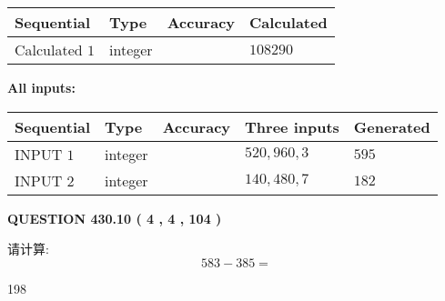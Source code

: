 \documentclass{ctexart}
\begin{document}
   
   
   
\noindent{}
   
   
  
  
\noindent\begin{tabular}{|l|l|l|l|}
\hline
 Sequential & Type & Accuracy & Calculated \\ 
\hline
 
 
  Calculated $  1 $ & integer &  & 
  $ 108290 $ 
 \\  \hline  
 \end{tabular}
   
   
   
   
\noindent\vspace{0.1in}\hspace{-0.08in} {\textbf{\Large{All inputs: }}}
   
   
  
  
\noindent\begin{tabular}{|l|l|l|l|l|}
\hline
 Sequential & Type & Accuracy & Three inputs & Generated \\ 
\hline
 
 
  INPUT $  1 $ & integer &  & $
 520
 , 
 960
 , 
 3
 $ & $ 595 $ 
 \\  \hline  
 
 
  INPUT $  2 $ & integer &  & $
 140
 , 
 480
 , 
 7
 $ & $ 182 $ 
 \\  \hline  
 \end{tabular}
   
   
  
\vspace{0.2in}
  
{\textbf{\Large{QUESTION
430.10 
 ( 4 , 4 , 104 )
}}}
  
  
 
请计算:
\begin{equation}
583 -   %
385 = \nonumber
\end{equation}
 
 
 
\noindent{}
 
 

198
 
 
\noindent{}
 
 

 
 
 
\noindent{}
 
\end{document}
